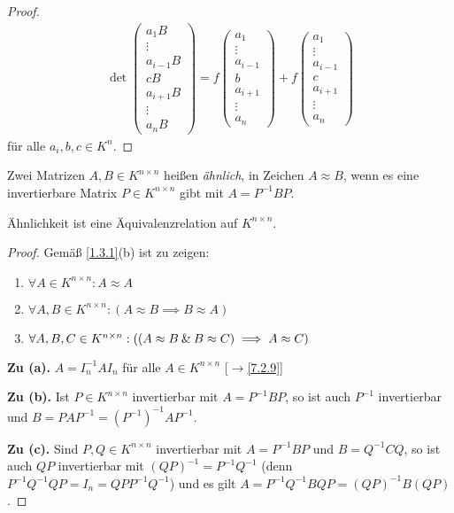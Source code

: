 \documentclass[../../main.tex]{subfiles}
\begin{document}
\begin{proof}
\begin{multline*}
\det\begin{pmatrix}a_1B\\\vdots\\a_{i-1}B\\cB\\a_{i+1}B\\\vdots\\a_nB\end{pmatrix}=
f\begin{pmatrix}a_1\\\vdots\\a_{i-1}\\b\\a_{i+1}\\\vdots\\a_n\end{pmatrix}+
f\begin{pmatrix}a_1\\\vdots\\a_{i-1}\\c\\a_{i+1}\\\vdots\\a_n\end{pmatrix}
\end{multline*}
für alle $a_i,b,c\in K^n$.
\end{proof}


\begin{df}\label{9.1.16}
Zwei Matrizen $A,B\in K^{n\times n}$ heißen \emph{ähnlich}, in Zeichen $A\approx B$, wenn es eine
invertierbare Matrix $P\in K^{n\times n}$ gibt mit $A=P^{-1}BP$.
\end{df}

\begin{pro}\label{9.1.17}
Ähnlichkeit ist eine Äquivalenzrelation auf $K^{n\times n}$.
\end{pro}

\begin{proof} Gemäß \ref{1.3.1}(b) ist zu zeigen:
\begin{enumerate}[\normalfont(a)]
\item $\forall A\in K^{n\times n}:A\approx A$
\item $\forall A,B\in K^{n\times n}:(A\approx B\implies B\approx A)$
\item $\forall A,B,C\in K^{n\times n}:((A\approx B\mathbin{\&} B\approx C)\implies A\approx C)$
\end{enumerate}
\textbf{Zu (a).} $A=I_n^{-1}AI_n$ für alle $A\in K^{n\times n}$ [$\to$\ref{7.2.9}]

\medskip\noindent
\textbf{Zu (b).} Ist $P\in K^{n\times n}$ invertierbar mit $A=P^{-1}BP$, so ist auch $P^{-1}$ invertierbar und $B=PAP^{-1}=(P^{-1})^{-1}AP^{-1}$.

\medskip\noindent
\textbf{Zu (c).} Sind $P,Q\in K^{n\times n}$ invertierbar mit $A=P^{-1}BP$ und $B=Q^{-1}CQ$, so ist auch $QP$ invertierbar mit $(QP)^{-1}=P^{-1}Q^{-1}$
(denn $P^{-1}Q^{-1}QP=I_n=QPP^{-1}Q^{-1}$) und es gilt $A=P^{-1}Q^{-1}BQP=(QP)^{-1}B(QP)$.
\end{proof}
\end{document}
